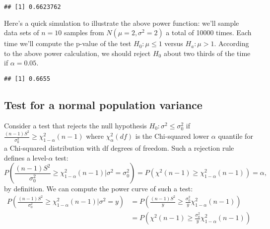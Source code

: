 \documentclass[
]{book}
\newenvironment{Shaded}{\begin{snugshade}}{\end{snugshade}}
\newcommand{\AttributeTok}[1]{\textcolor[rgb]{0.77,0.63,0.00}{#1}}
\newcommand{\ConstantTok}[1]{\textcolor[rgb]{0.00,0.00,0.00}{#1}}
\newcommand{\ControlFlowTok}[1]{\textcolor[rgb]{0.13,0.29,0.53}{\textbf{#1}}}
\newcommand{\DecValTok}[1]{\textcolor[rgb]{0.00,0.00,0.81}{#1}}
\newcommand{\FloatTok}[1]{\textcolor[rgb]{0.00,0.00,0.81}{#1}}
\newcommand{\FunctionTok}[1]{\textcolor[rgb]{0.00,0.00,0.00}{#1}}
\newcommand{\NormalTok}[1]{#1}
\newcommand{\OtherTok}[1]{\textcolor[rgb]{0.56,0.35,0.01}{#1}}
\newcommand{\SpecialCharTok}[1]{\textcolor[rgb]{0.00,0.00,0.00}{#1}}
\newcommand{\StringTok}[1]{\textcolor[rgb]{0.31,0.60,0.02}{#1}}
\begin{document}
\begin{verbatim}
## [1] 0.6623762
\end{verbatim}

Here's a quick simulation to illustrate the above power function: we'll sample data sets of \(n=10\) samples from \(N(\mu = 2, \sigma^2 = 2)\) a total of 10000 times. Each time we'll compute the p-value of the test \(H_0:\mu \leq 1\) versus \(H_a:\mu > 1\). According to the above power calculation, we should reject \(H_0\) about two thirds of the time if \(\alpha = 0.05\).

\begin{Shaded}
\end{Shaded}

\begin{verbatim}
## [1] 0.6655
\end{verbatim}

\hypertarget{test-for-a-normal-population-variance}{%
\subsection{Test for a normal population variance}\label{test-for-a-normal-population-variance}}

Consider a test that rejects the null hypothesis \(H_0:\sigma^2 \leq \sigma_0^2\) if \(\frac{(n-1)S^2}{\sigma_0^2} \geq \chi^2_{1-\alpha}(n-1)\) where \(\chi^2_{\alpha}(df)\) is the Chi-squared lower \(\alpha\) quantile for a Chi-squared distribution with df degrees of freedom. Such a rejection rule defines a level-\(\alpha\) test:
\[P\left(\frac{(n-1)S^2}{\sigma_0^2} \geq  \chi^2_{1-\alpha}(n-1)|\sigma^2 = \sigma_0^2\right) = P\left(\chi^{2}(n-1) \geq  \chi^2_{1-\alpha}(n-1)\right) = \alpha,\]
by definition. We can compute the power curve of such a test:
\begin{align*}
P\left(\frac{(n-1)S^2}{\sigma_0^2} \geq  \chi^2_{1-\alpha}(n-1)|\sigma^2 = y\right) & = P\left(\frac{(n-1)S^2}{y} \geq  \frac{\sigma_0^2}{y}\chi^2_{1-\alpha}(n-1)\right)\\
& = P\left(\chi^2(n-1) \geq  \frac{\sigma_0^2}{y}\chi^2_{1-\alpha}(n-1)\right)
\end{align*}
\end{document}
